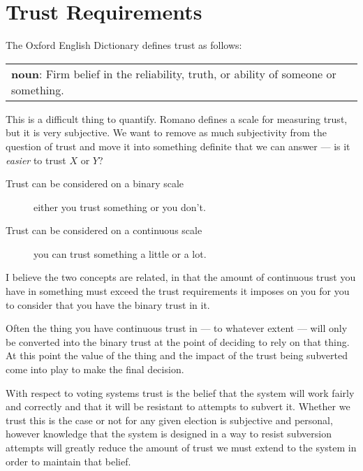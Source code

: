 \section{Trust Requirements}
\label{ch:req:trust}

The Oxford English Dictionary defines trust as follows:

\vspace{1em}
\noindent \begin{tabular}{|p{}}
    \noindent \textbf{noun}: Firm belief in the reliability, truth, or ability of someone or something.
\end{tabular}
\vspace{1em}

This is a difficult thing to quantify. Romano \cite{romanoNatureTrustConceptual2003} defines a scale for measuring trust, but it is very subjective. We want to remove as much subjectivity from the question of trust and move it into something definite that we can answer --- is it \emph{easier} to trust $X$ or $Y$?

\begin{description}
    \item[Trust can be considered on a binary scale] either you trust something or you don't.
    \item[Trust can be considered on a continuous scale] you can trust something a little or a lot.
\end{description}

I believe the two concepts are related, in that the amount of continuous trust you have in something must exceed the trust requirements it imposes on you for you to consider that you have the binary trust in it.

Often the thing you have continuous trust in --- to whatever extent --- will only be converted into the binary trust at the point of deciding to rely on that thing. At this point the value of the thing and the impact of the trust being subverted come into play to make the final decision.

With respect to voting systems trust is the belief that the system will work fairly and correctly and that it will be resistant to attempts to subvert it. Whether we trust this is the case or not for any given election is subjective and personal, however knowledge that the system is designed in a way to resist subversion attempts will greatly reduce the amount of trust we must extend to the system in order to maintain that belief.

